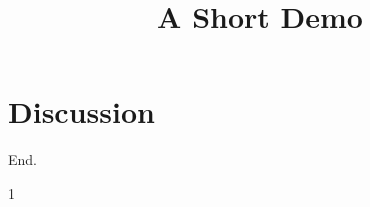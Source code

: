 \documentclass[article]{jss}
\title{A Short Demo}
\begin{document}
\section{Discussion}
End.
\begin{thebibliography}{1}
\end{thebibliography}
\end{document}
